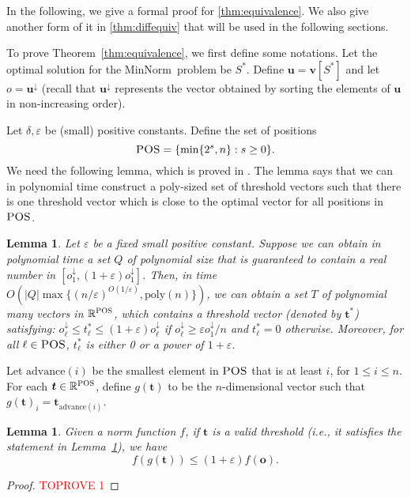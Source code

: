 \documentclass[11pt,a4paper]{article} \usepackage{enumitem}
\newcommand{\da}{\downarrow}
\newcommand{\boldu}{\boldsymbol{u}}
\newcommand{\boldv}{\boldsymbol{v}}
\newcommand{\boldt}{\boldsymbol{t}}
\newcommand{\boldo}{\boldsymbol{o}}
\newcommand{\minnorm}{\textsf{MinNorm}}
\newcommand{\R}{\mathbb{R}}
\newcommand{\POS}{\textsc{POS}}
\newtheorem{lemma}[theorem]{Lemma}
\theoremstyle{definition}
\begin{document}
In the following, we give a formal proof for \cref{thm:equivalence}.
We also give another form of it in \cref{thm:diffequiv} that will be used in the following sections.

To prove Theorem~\ref{thm:equivalence}, we first define 
some notations.
Let the optimal solution for the \minnorm\ problem be $S^*$. Define $\boldu = \boldv[S^*]$ and let $o = \boldu^{\da}$ (recall that $\boldu^{\da}$ represents the vector obtained by sorting the elements of $\boldu$ in non-increasing order).

Let $\delta,\varepsilon$ be (small) positive constants. 
Define the set of positions
$$
\POS=\{\min\{2^s,n\}:s\geq 0\}.
$$
We need the following lemma, which is proved in \cite{chakrabarty2019approximation}.
The lemma says that we can in polynomial time construct a poly-sized set 
of threshold vectors such that there is one threshold vector
which is close to the optimal vector for all positions in $\POS$.

\begin{lemma}
\label{lm:polyguess}
\cite{chakrabarty2019approximation}
Let $\varepsilon$ be a fixed small positive constant. Suppose we can obtain in polynomial time a set $Q$ of polynomial size that is guaranteed to contain a real number in $[o_1^\da,(1+\varepsilon)o_1^\da]$.
Then, in time $O\left(|Q|\max\{(n/\varepsilon)^{O(1/\varepsilon)},\text{poly}(n)\}\right)$, we can obtain a set $T$ of polynomial many vectors in $\R^{\POS}$, which contains a threshold vector (denoted by $\boldsymbol{t}^*$) satisfying:
$o_\ell^\da\leq t^*_\ell\leq (1+\varepsilon)o_\ell^\da$ if $o_\ell^\da\geq \varepsilon o_1^\da/n$ and $t^*_\ell=0$ otherwise.
Moreover, for all $\ell\in \POS$,
$t^*_\ell$ is either 0 or a power of $1+\varepsilon$.
\end{lemma}

Let $\text{advance}(i)$ be the smallest element in $\POS$ that is at least $i$, for 
$1\leq i\leq n$.
For each $\boldt\in\R^\POS$, define $g(\boldt)$ to be the $n$-dimensional vector such that $g(\boldt)_i=\boldt_{\text{advance}(i)}$. 


\begin{lemma}
\label{lem:d-2}
Given a norm function $f$, if $\boldt$ is a valid threshold (i.e., it satisfies the statement in Lemma~\ref{lm:polyguess}), 
we have
$$f(g(\boldt))\leq (1+\varepsilon)f(\boldo).$$
\end{lemma}
\begin{proof}\textcolor{red}{TOPROVE 1}\end{proof}
\end{document}
